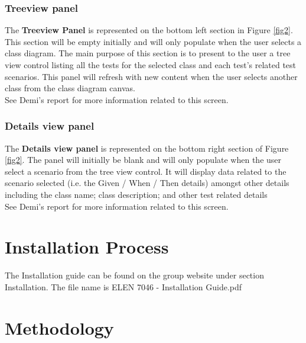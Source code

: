 \documentclass[a4paper,12pt]{Article}
\begin{document}
\subsubsection{Treeview panel}
The \textbf{Treeview Panel} is represented on the bottom left section in Figure \ref{fig2}. This section will be empty initially and will only populate when the user selects a class diagram. The main purpose of this section is to present to the user a tree view control listing all the tests for the selected class and each test's related test scenarios. This panel will refresh with new content when the user selects another class from the class diagram canvas.\\
\linebreak
See Demi’s\cite{reportDemi} report for more information related to this screen.

\subsubsection{Details view panel}
The \textbf{Details view panel} is represented on the bottom right section of Figure \ref{fig2}. The panel will initially be blank and will only populate when the user select a scenario from the tree view control. It will display data related to the scenario selected (i.e. the Given / When / Then details) amongst other details including the class name; class description; and other test related details\\
\linebreak
See Demi’s\cite{reportDemi} report for more information related to this screen.


\section{Installation Process}
The Installation guide can be found on the group website under section Installation. The file name is ELEN 7046 - Installation Guide.pdf 
\section{Methodology}
\end{document}
